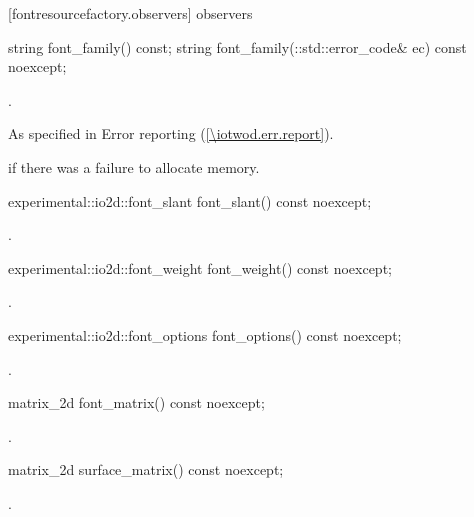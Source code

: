  [fontresourcefactory.observers] { observers}

\begin{itemdecl}
string font_family() const;
string font_family(::std::error_code& ec) const noexcept;
\end{itemdecl}
\begin{itemdescr}
\pnum
\returns
{}.

\throws
As specified in Error reporting (\ref{\iotwod.err.report}).

\pnum
\errors
{} if there was a failure to allocate memory.
\end{itemdescr}

\begin{itemdecl}
experimental::io2d::font_slant font_slant() const noexcept;
\end{itemdecl}
\begin{itemdescr}
\pnum
\returns
{}.
\end{itemdescr}

\begin{itemdecl}
experimental::io2d::font_weight font_weight() const noexcept;
\end{itemdecl}
\begin{itemdescr}
\pnum
\returns
{}.
\end{itemdescr}

\begin{itemdecl}
experimental::io2d::font_options font_options() const noexcept;
\end{itemdecl}
\begin{itemdescr}
\pnum
\returns
{}.
\end{itemdescr}

\begin{itemdecl}
matrix_2d font_matrix() const noexcept;
\end{itemdecl}
\begin{itemdescr}
\pnum
\returns
{}.
\end{itemdescr}

\begin{itemdecl}
matrix_2d surface_matrix() const noexcept;
\end{itemdecl}
\begin{itemdescr}
\pnum
\returns
{}.
\end{itemdescr}

